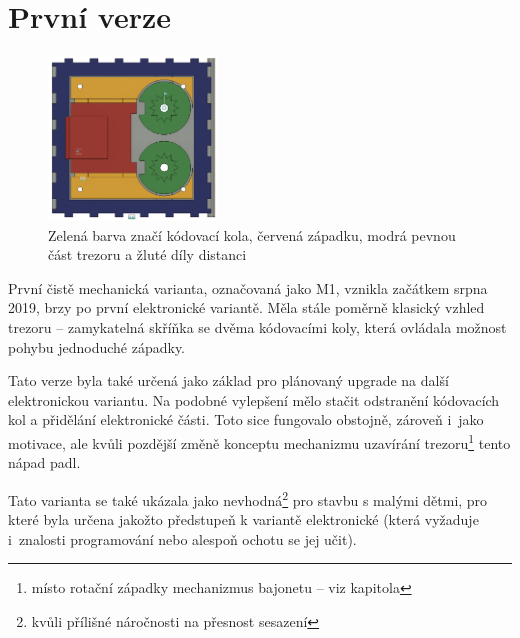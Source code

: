 \section{První verze}
\label{M1-vyvoj}

\begin{figure}
    \centering
    \includegraphics[width=0.4\textwidth]{kapitoly/obrazky/M1/mechanizmus.png}
    \caption{Zelená barva značí kódovací kola, červená západku, modrá pevnou část trezoru a žluté díly distanci \centering}
    \label{fig:M1-mechanizmus}
\end{figure}
První čistě mechanická varianta, označovaná jako M1, vznikla začátkem srpna 2019, brzy po první  elektronické variantě.
Měla stále poměrně klasický vzhled trezoru -- zamykatelná skříňka se dvěma  kódovacími koly, která ovládala možnost pohybu jednoduché západky.

Tato verze byla také určená jako základ pro plánovaný upgrade na další elektronickou
variantu. Na podobné vylepšení mělo stačit odstranění kódo\-va\-cích kol a přidělání elektronické části. Toto sice fungovalo obstojně, zároveň 
i~jako motivace, ale kvůli pozdější změně konceptu mechanizmu uzavírání trezoru\footnote{místo rotační západky mechanizmus bajonetu -- viz kapitola %
} tento nápad padl.

Tato varianta se také ukázala jako nevhodná\footnote{kvůli přílišné náročnosti na přesnost sesazení} pro stavbu s malými dětmi, 
pro které byla určena jakožto předstupeň k variantě elektronické (která vyžaduje i~znalosti programování nebo alespoň ochotu se jej  učit).